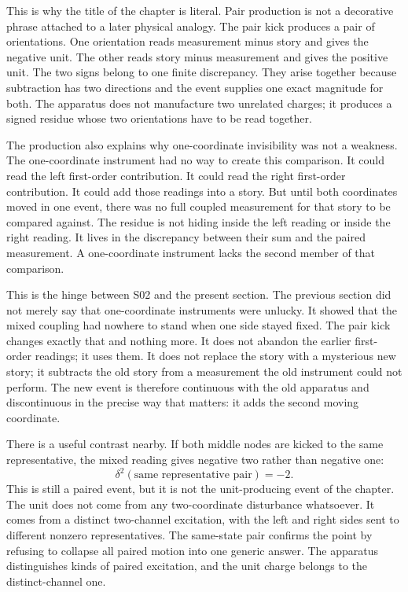 This is why the title of the chapter is literal. Pair production is not a
decorative phrase attached to a later physical analogy. The pair kick produces
a pair of orientations. One orientation reads measurement minus story and gives
the negative unit. The other reads story minus measurement and gives the
positive unit. The two signs belong to one finite discrepancy. They arise
together because subtraction has two directions and the event supplies one
exact magnitude for both. The apparatus does not manufacture two unrelated
charges; it produces a signed residue whose two orientations have to be read
together.

The production also explains why one-coordinate invisibility was not a
weakness. The one-coordinate instrument had no way to create this comparison.
It could read the left first-order contribution. It could read the right
first-order contribution. It could add those readings into a story. But until
both coordinates moved in one event, there was no full coupled measurement for
that story to be compared against. The residue is not hiding inside the left
reading or inside the right reading. It lives in the discrepancy between their
sum and the paired measurement. A one-coordinate instrument lacks the second
member of that comparison.

This is the hinge between S02 and the present section. The previous section did
not merely say that one-coordinate instruments were unlucky. It showed that the
mixed coupling had nowhere to stand when one side stayed fixed. The pair kick
changes exactly that and nothing more. It does not abandon the earlier
first-order readings; it uses them. It does not replace the story with a
mysterious new story; it subtracts the old story from a measurement the old
instrument could not perform. The new event is therefore continuous with the
old apparatus and discontinuous in the precise way that matters: it adds the
second moving coordinate.

There is a useful contrast nearby. If both middle nodes are kicked to the same
representative, the mixed reading gives negative two rather than negative one:
\[
  \delta^2(\text{same representative pair}) = -2.
\]
This is still a paired event, but it is not the unit-producing event of the
chapter. The unit does not come from any two-coordinate disturbance whatsoever.
It comes from a distinct two-channel excitation, with the left and right sides
sent to different nonzero representatives. The same-state pair confirms the
point by refusing to collapse all paired motion into one generic answer. The
apparatus distinguishes kinds of paired excitation, and the unit charge belongs
to the distinct-channel one.

